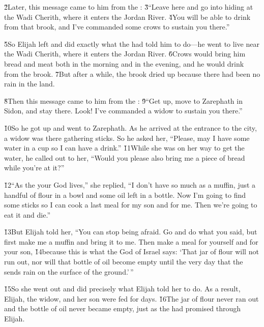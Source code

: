 \v{2}Later, this message came to him from the : \v{3}``Leave here and go into hiding at the Wadi Cherith, where it enters the Jordan River. \v{4}You will be able to drink from that brook, and I've commanded some crows to sustain you there.''

\v{5}So Elijah left and did exactly what the  had told him to do---he went to live near the Wadi Cherith, where it enters the Jordan River. \v{6}Crows would bring him bread and meat both in the morning and in the evening, and he would drink from the brook. \v{7}But after a while, the brook dried up because there had been no rain in the land.

\v{8}Then this message came to him from the : \v{9}``Get up, move to Zarephath in Sidon, and stay there. Look! I've commanded a widow to sustain you there.''

\v{10}So he got up and went to Zarephath. As he arrived at the entrance to the city, a widow was there gathering sticks. So he asked her, ``Please, may I have some water in a cup so I can have a drink.'' \v{11}While she was on her way to get the water, he called out to her, ``Would you please also bring me a piece of bread while you're at it?''

\v{12}``As the  your God lives,'' she replied, ``I don't have so much as a muffin, just a handful of flour in a bowl and some oil left in a bottle. Now I'm going to find some sticks so I can cook a last meal for my son and for me. Then we're going to eat it and die.''

\v{13}But Elijah told her, ``You can stop being afraid. Go and do what you said, but first make me a muffin and bring it to me. Then make a meal for yourself and for your son, \v{14}because this is what the  God of Israel says: `That jar of flour will not run out, nor will that bottle of oil become empty until the very day that the  sends rain on the surface of the ground.'\,''

\v{15}So she went out and did precisely what Elijah told her to do. As a result, Elijah, the widow, and her son were fed for days. \v{16}The jar of flour never ran out and the bottle of oil never became empty, just as the  had promised through Elijah.

